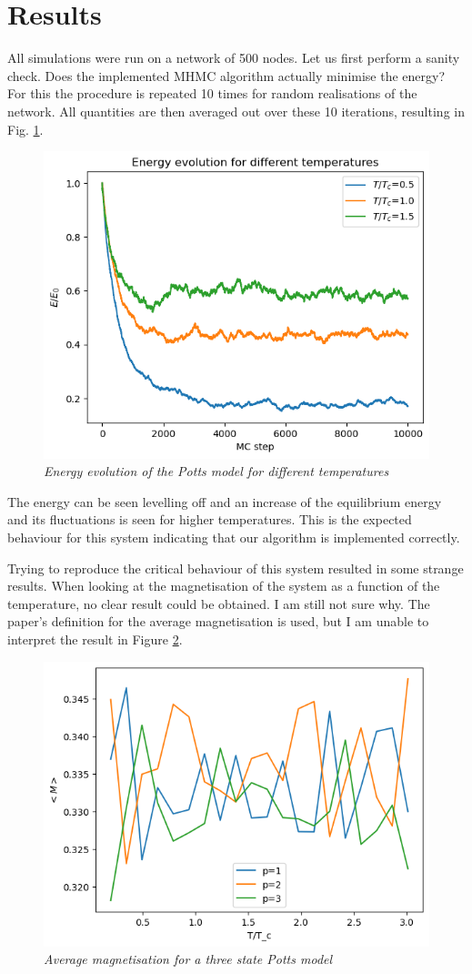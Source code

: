 \section{Results}
All simulations were run on a network of 500 nodes.
Let us first perform a sanity check. Does the implemented MHMC algorithm actually minimise the energy? For this the procedure is repeated 10 times for random realisations of the network. All quantities are then averaged out over these 10 iterations, resulting in Fig. \ref{potts energy evol}.

\begin{figure}[H]
    \centering
    \includegraphics[width=0.7\linewidth]{images/potts_energy evol.png}
    \caption{\textit{Energy evolution of the Potts model for different temperatures}}
    \label{potts energy evol}
\end{figure}

The energy can be seen levelling off and an increase of the equilibrium energy and its fluctuations is seen for higher temperatures. This is the expected behaviour for this system indicating that our algorithm is implemented correctly.

Trying to reproduce the critical behaviour of this system resulted in some strange results. When looking at the magnetisation of the system as a function of the temperature, no clear result could be obtained. I am still not sure why. The paper's definition for the average magnetisation is used, but I am unable to interpret the result in Figure \ref{avmag}.

\begin{figure}[H]
    \centering
    \includegraphics[width=0.5\linewidth]{images/av_mag.png}
    \caption{\textit{Average magnetisation for a three state Potts model}}
    \label{avmag}
\end{figure}

\newpage